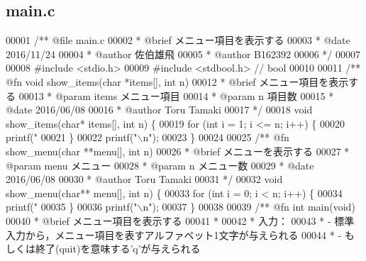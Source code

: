 \subsection{main.\-c}

\begin{DoxyCode}
00001 \textcolor{comment}{/**  @file main.c}
00002 \textcolor{comment}{ *   @brief  メニュー項目を表示する}
00003 \textcolor{comment}{ *   @date   2016/11/24}
00004 \textcolor{comment}{ *   @author 佐伯雄飛}
00005 \textcolor{comment}{ *   @author B162392}
00006 \textcolor{comment}{ */}
00007 
00008 \textcolor{preprocessor}{#include <stdio.h>}
00009 \textcolor{preprocessor}{#include <stdbool.h>}  \textcolor{comment}{// bool}
00010 \textcolor{comment}{}
00011 \textcolor{comment}{/** @fn     void show\_items(char *items[], int n)}
00012 \textcolor{comment}{ *  @brief  メニュー項目を表示する}
00013 \textcolor{comment}{ *  @param  items メニュー項目}
00014 \textcolor{comment}{ *  @param  n 項目数}
00015 \textcolor{comment}{ *  @date   2016/06/08}
00016 \textcolor{comment}{ *  @author Toru Tamaki}
00017 \textcolor{comment}{ */}
00018 \textcolor{keywordtype}{void} show_items(\textcolor{keywordtype}{char}* items[], \textcolor{keywordtype}{int} n) \{
00019   \textcolor{keywordflow}{for} (\textcolor{keywordtype}{int} i = 1; i <= n; i++) \{
00020     printf(\textcolor{stringliteral}{"%
00021   \}
00022   printf(\textcolor{stringliteral}{"\(\backslash\)n"});
00023 \}
00024 \textcolor{comment}{}
00025 \textcolor{comment}{/** @fn     show\_menu(char **menu[], int n)}
00026 \textcolor{comment}{ *  @brief  メニューを表示する}
00027 \textcolor{comment}{ *  @param  menu メニュー}
00028 \textcolor{comment}{ *  @param  n メニュー数}
00029 \textcolor{comment}{ *  @date   2016/06/08}
00030 \textcolor{comment}{ *  @author Toru Tamaki}
00031 \textcolor{comment}{ */}
00032 \textcolor{keywordtype}{void} show_menu(\textcolor{keywordtype}{char}** menu[], \textcolor{keywordtype}{int} n) \{
00033   \textcolor{keywordflow}{for} (\textcolor{keywordtype}{int} i = 0; i < n; i++) \{
00034     printf(\textcolor{stringliteral}{"%
00035   \}
00036   printf(\textcolor{stringliteral}{"\(\backslash\)n"});
00037 \}
00038 \textcolor{comment}{}
00039 \textcolor{comment}{/** @fn int main(void)}
00040 \textcolor{comment}{ *  @brief メニュー項目を表示する}
00041 \textcolor{comment}{ *}
00042 \textcolor{comment}{ *  入力：}
00043 \textcolor{comment}{ *  - 標準入力から，メニュー項目を表すアルファベット1文字が与えられる}
00044 \textcolor{comment}{ *  - もしくは終了(quit)を意味する'q'が与えられる}
}}
\end{DoxyCode}
